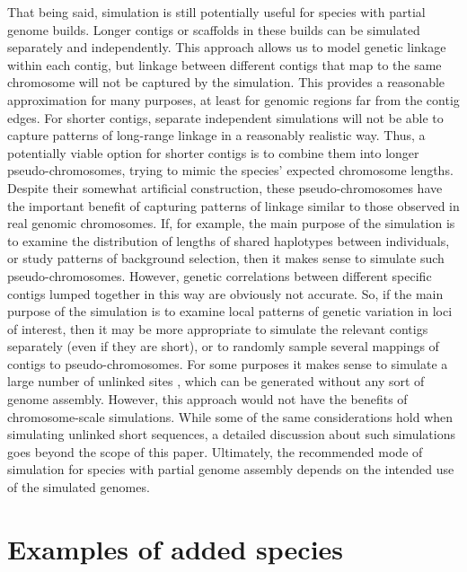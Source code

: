 \documentclass[hidelinks]{article}
\makeatletter
\newcommand{\labelname}[1]{\def\@currentlabelname{#1}}
\makeatother
\begin{document}
That being said, simulation is still potentially useful for species with partial genome builds.
Longer contigs or scaffolds in these builds can be simulated separately and independently.
This approach allows us to model genetic linkage within each contig,
but linkage between different contigs that map to the same chromosome will not be captured by the simulation.
This provides a reasonable approximation for many purposes, at least for genomic regions far from the contig edges.
For shorter contigs, separate independent simulations will not be able to capture patterns of long-range linkage in a reasonably realistic way.
Thus, a potentially viable option for shorter contigs is to combine them into longer pseudo-chromosomes, trying to mimic the species' expected chromosome lengths.
Despite their somewhat artificial construction,
these pseudo-chromosomes have the important benefit of
capturing patterns of linkage similar to those observed in real genomic chromosomes.
If, for example, the main purpose of the simulation is to examine the distribution of lengths of shared haplotypes between individuals,
or study patterns of background selection,
then it makes sense to simulate such pseudo-chromosomes.
However, genetic correlations between different specific contigs lumped together in this way are obviously not accurate.
So, if the main purpose of the simulation is to examine local patterns of genetic variation in loci of interest, then it may be more appropriate to simulate the relevant contigs separately (even if they are short), or to randomly sample several mappings of contigs to pseudo-chromosomes.
For some purposes it makes sense to simulate a large number of unlinked sites \citep{Gutenkunst2009,Excoffier2013},
which can be generated without any sort of genome assembly.
However, this approach would not have the benefits of chromosome-scale simulations.
While some of the same considerations hold when simulating unlinked short sequences, a detailed discussion about such simulations goes beyond the scope of this paper.
Ultimately, the recommended mode of simulation for species with partial genome assembly depends on the intended use of the simulated genomes.

\section*{Examples of added species}
    \labelname{Examples}
    \label{sec:examples}
\end{document}
